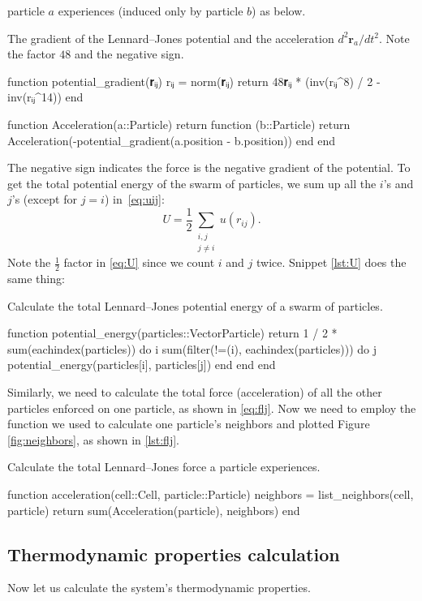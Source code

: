 particle $a$ experiences (induced only by particle $b$) as below.
%
\begin{algorithm}
    \caption{The gradient of the Lennard--Jones potential and the acceleration
        $d^2 \bm{r}_a / d t^2$. Note the factor $48$ and the negative sign.}
    \label{lst:gradient}
    \begin{juliacode}
        function potential_gradient(𝐫ᵢⱼ)
            rᵢⱼ = norm(𝐫ᵢⱼ)
            return 48𝐫ᵢⱼ * (inv(rᵢⱼ^8) / 2 - inv(rᵢⱼ^14))
        end

        function Acceleration(a::Particle)
            return function (b::Particle)
                return Acceleration(-potential_gradient(a.position - b.position))
            end
        end
    \end{juliacode}
\end{algorithm}
%
The negative sign indicates the force is the negative gradient of the potential.
To get the total potential energy of the swarm of particles, we sum up all the $i$'s
and $j$'s (except for $j = i$) in~\eqref{eq:uij}:
%
\begin{equation}\label{eq:U}
    U = \frac{ 1 }{ 2 }\sum_{\substack{i, j\\ j \neq i}} u(r_{ij}).
\end{equation}
%
Note the $\frac{ 1 }{ 2 }$ factor in \eqref{eq:U} since we count $i$ and $j$ twice.
Snippet \ref{lst:U} does the same thing:

\begin{algorithm}
    \caption{Calculate the total Lennard--Jones potential energy of a swarm of particles.}
    \label{lst:U}
    \begin{juliacode}
        function potential_energy(particles::Vector{Particle})
            return 1 / 2 * sum(eachindex(particles)) do i
                sum(filter(!=(i), eachindex(particles))) do j
                    potential_energy(particles[i], particles[j])
                end
            end
        end
    \end{juliacode}
\end{algorithm}

Similarly, we need to calculate the total force (acceleration) of all the other particles
enforced on one particle, as shown in \eqref{eq:flj}. Now we need to employ the
 function we used to calculate one particle's neighbors and plotted
Figure \ref{fig:neighbors}, as shown in \ref{lst:flj}.
%
\begin{algorithm}
    \caption{Calculate the total Lennard--Jones force a particle experiences.}
    \label{lst:flj}
    \begin{juliacode}
        function acceleration(cell::Cell, particle::Particle)
            neighbors = list_neighbors(cell, particle)
            return sum(Acceleration(particle), neighbors)
        end
    \end{juliacode}
\end{algorithm}
%


\subsection{Thermodynamic properties calculation}

Now let us calculate the  system's thermodynamic properties.
